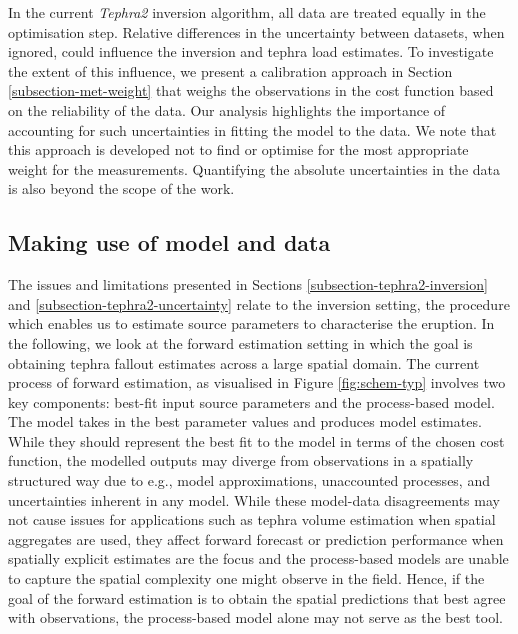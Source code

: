 \documentclass[a4paper,fleqn]{cas-sc}
\begin{document}
    In the current \textit{Tephra2} inversion algorithm, all data are treated equally in the optimisation step. Relative differences in the uncertainty between datasets, when ignored, could influence the inversion and tephra load estimates. To investigate the extent of this influence, we present a calibration approach in Section \ref{subsection-met-weight} that weighs the observations in the cost function based on the reliability of the data. Our analysis highlights the importance of accounting for such uncertainties in fitting the model to the data. We note that this approach is developed not to find or optimise for the most appropriate weight for the measurements. Quantifying the absolute uncertainties in the data is also beyond the scope of the work.

 
\subsection{Making use of model and data} \label{subsection-tephra2-prediction}

The issues and limitations presented in Sections \ref{subsection-tephra2-inversion} and \ref{subsection-tephra2-uncertainty} relate to the inversion setting, the procedure which enables us to estimate source parameters to characterise the eruption. In the following, we look at the forward estimation setting in which the goal is obtaining tephra fallout estimates across a large spatial domain. The current process of forward estimation, as visualised in Figure \ref{fig:schem-typ} involves two key components: best-fit input source parameters and the process-based model. The model takes in the best parameter values and produces model estimates. While they should represent the best fit to the model in terms of the chosen cost function, the modelled outputs may diverge from observations in a spatially structured way due to e.g., model approximations, unaccounted processes, and uncertainties inherent in any model. While these model-data disagreements may not cause issues for applications such as tephra volume estimation when spatial aggregates are used, they affect forward forecast or prediction performance when spatially explicit estimates are the focus and the process-based models are unable to capture the spatial complexity one might observe in the field. Hence, if the goal of the forward estimation is to obtain the spatial predictions that best agree with observations, the process-based model alone may not serve as the best tool.
\end{document}
